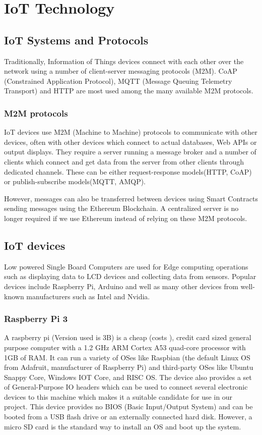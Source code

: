 \documentclass[11pt,openright]{report}
\begin{document}
\chapter{IoT Technology}
\label{chapter:iot_tech}
\section{IoT Systems and Protocols}
Traditionally, Information of Things devices connect with each other over the network using a number of client-server messaging protocols (M2M). CoAP (Constrained Application Protocol), MQTT (Message Queuing Telemetry Transport) and HTTP are most used among the many available M2M protocols.

\subsection{M2M protocols}
IoT devices use M2M (Machine to Machine) protocols to communicate with other devices, often with other devices which connect to actual databases, Web APIs or output displays. They require a server running a message broker and a number of clients which connect and get data from the server from other clients through dedicated channels. These can be either request-response models(HTTP, CoAP) or publish-subscribe models(MQTT, AMQP).

However, messages can also be transferred between devices using Smart Contracts sending messages using the Ethereum Blockchain. A centralized server is no longer required if we use Ethereum instead of relying on these M2M protocols.

\section{IoT devices}
Low powered Single Board Computers are used for Edge computing operations such as displaying data to LCD devices and collecting data from sensors. Popular devices include Raspberry Pi, Arduino and well as many other devices from well-known manufacturers such as Intel and Nvidia.

\subsection{Raspberry Pi 3}
A raspberry pi (Version used is 3B) is a cheap (costs ), credit card sized general purpose computer with a 1.2 GHz ARM Cortex A53 quad-core processor with 1GB of RAM. It can run a variety of OSes like Raspbian (the default Linux OS from Adafruit, manufacturer of Raspberry Pi) and third-party OSes like Ubuntu Snappy Core, Windows IOT Core, and RISC OS. The device also provides a set of General-Purpose IO headers which can be used to connect several electronic devices to this machine which makes it a suitable candidate for use in our project. This device provides no BIOS (Basic Input/Output System) and can be booted from a USB flash drive or an externally connected hard disk. However, a micro SD card is the standard way to install an OS and boot up the system.  
\end{document}
